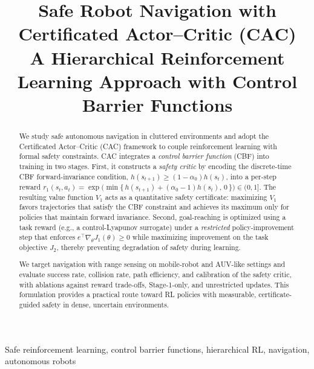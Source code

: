 \documentclass[10pt,conference]{IEEEtran}
\begin{document}
\title{
Safe Robot Navigation with Certificated Actor--Critic (CAC)\\
\large A Hierarchical Reinforcement Learning Approach with Control Barrier Functions
}

\author{
}

\maketitle

\begin{abstract}
We study safe autonomous navigation in cluttered environments and adopt the Certificated Actor--Critic (CAC) framework to couple reinforcement learning with formal safety constraints. CAC integrates a \emph{control barrier function} (CBF) into training in two stages. First, it constructs a \emph{safety critic} by encoding the discrete-time CBF forward-invariance condition, $h(s_{t+1}) \ge (1-\alpha_0) h(s_t)$, into a per-step reward
$ r_1(s_t,a_t) = \exp\!\big(\min\{\,h(s_{t+1}) + (\alpha_0-1)h(s_t),\,0\,\}\big) \in (0,1] $. The resulting value function $V_1$ acts as a quantitative safety certificate: maximizing $V_1$ favors trajectories that satisfy the CBF constraint and achieves its maximum only for policies that maintain forward invariance. Second, goal-reaching is optimized using a task reward (e.g., a control-Lyapunov surrogate) under a \emph{restricted} policy-improvement step that enforces $e^\top \nabla_\theta J_1(\theta) \ge 0$ while maximizing improvement on the task objective $J_2$, thereby preventing degradation of safety during learning.

We target navigation with range sensing on mobile-robot and AUV-like settings and evaluate success rate, collision rate, path efficiency, and calibration of the safety critic, with ablations against reward trade-offs, Stage-1-only, and unrestricted updates. This formulation provides a practical route toward RL policies with measurable, certificate-guided safety in dense, uncertain environments.
\end{abstract}

\begin{IEEEkeywords}
Safe reinforcement learning, control barrier functions, hierarchical RL, navigation, autonomous robots
\end{IEEEkeywords}
\end{document}
